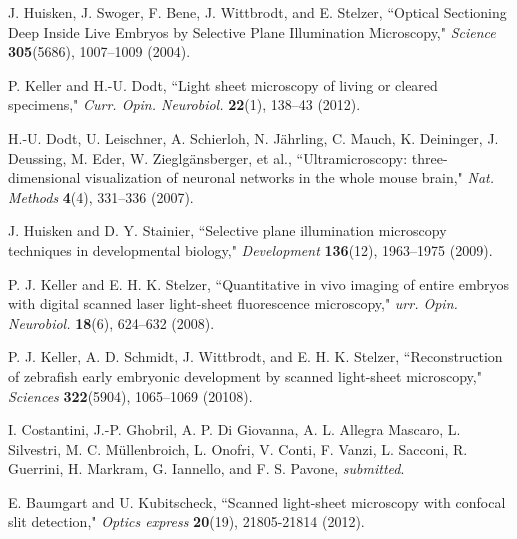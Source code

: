 \documentclass[12pt]{spieman}  %
\begin{document}

\begin{thebibliography}{0}

 J. Huisken, J. Swoger, F. Bene, J. Wittbrodt, and E. Stelzer, ``Optical Sectioning Deep Inside Live Embryos by Selective Plane Illumination Microscopy," \emph{Science} \textbf{305}(5686), 1007–1009 (2004). 

 P. Keller and H.-U. Dodt, ``Light sheet microscopy of living or cleared specimens," \emph{Curr. Opin. Neurobiol.} \textbf{22}(1), 138–43 (2012). 

 H.-U. Dodt, U. Leischner, A. Schierloh, N. J\"{a}hrling, C. Mauch, K. Deininger, J. Deussing, M. Eder, W. Zieglg\"{a}nsberger, et al., ``Ultramicroscopy: three-dimensional visualization of neuronal networks in the whole mouse brain," \emph{Nat. Methods} \textbf{4}(4), 331–336 (2007). 

 J. Huisken and D. Y. Stainier, ``Selective plane illumination microscopy techniques in developmental biology," \emph{Development} \textbf{136}(12), 1963–1975 (2009).

 P. J. Keller and E. H. K. Stelzer, ``Quantitative in vivo imaging of entire embryos with digital scanned laser light-sheet fluorescence microscopy," \emph{urr. Opin. Neurobiol.} \textbf{18}(6), 624–632 (2008).

 P. J. Keller, A. D. Schmidt, J. Wittbrodt, and E. H. K. Stelzer, ``Reconstruction of zebrafish early embryonic development by scanned light-sheet microscopy," \emph{Sciences} \textbf{322}(5904), 1065–1069 (20108).

 I. Costantini, J.-P. Ghobril, A. P. Di Giovanna, A. L. Allegra Mascaro, L. Silvestri, M. C. M\"{u}llenbroich, L. Onofri, V. Conti, F. Vanzi, L. Sacconi, R. Guerrini, H. Markram, G. Iannello, and F. S. Pavone, \emph{submitted}.

 E. Baumgart and U. Kubitscheck, ``Scanned light-sheet microscopy with confocal slit detection," \emph{Optics express} \textbf{20}(19), 21805-21814 (2012).

%
%


\end{thebibliography}
\end{document}
